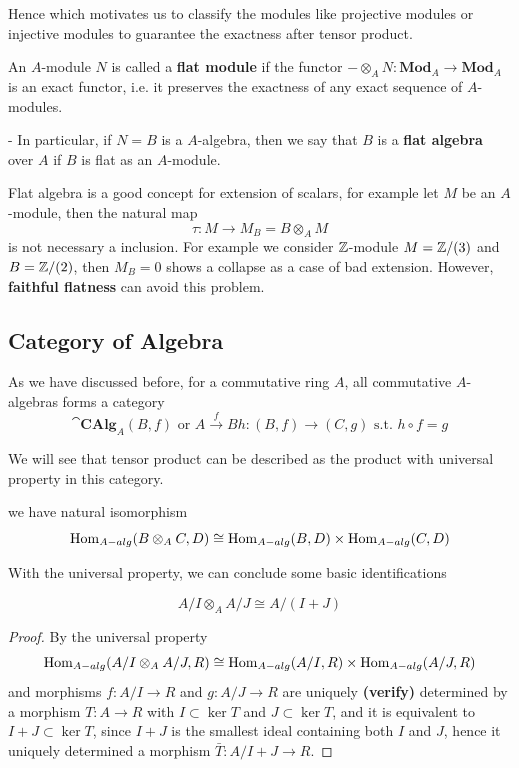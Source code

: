 Hence which motivates us to classify the modules like projective modules or injective modules to guarantee the exactness after tensor product.

\begin{definition}
    An \(A\)-module \(N\) is called a \textbf{flat module} if the functor \(- \otimes_A N: \mathbf{Mod}_A \to \mathbf{Mod}_A\) is an exact functor, i.e. it preserves the exactness of any exact sequence of \(A\)-modules.

    - In particular, if \(N = B\) is a \(A\)-algebra, then we say that \(B\) is a \textbf{flat algebra} over \(A\) if \(B\) is flat as an \(A\)-module.
\end{definition}

Flat algebra is a good concept for extension of scalars, for example let \(M\) be an \(A\)-module, then the natural map
\[\tau: M \to M_B = B \otimes_A M\]
is not necessary a inclusion. For example we consider \(\mathbb{Z}\)-module \(M = \mathbb{Z}/(3)\) and \(B = \mathbb{Z}/(2)\), then \(M_B = 0\) shows a collapse as a case of bad extension. However, \textbf{faithful flatness} can avoid this problem.

\subsection*{Category of Algebra}

As we have discussed before, for a commutative ring \(A\), all commutative \(A\)-algebras forms a category
\[\cat{\mathbf{CAlg}_A}{(B,f) \text{ or } A \xrightarrow{f} B}{h:(B,f) \to (C,g) \text{ s.t. } h \circ f = g} \]

We will see that tensor product can be described as the product with universal property in this category.
\begin{proposition}
    we have natural isomorphism
    \[\operatorname{Hom}_{A-alg}(B \otimes_A C, D) \cong \operatorname{Hom}_{A-alg}(B,D) \times \operatorname{Hom}_{A-alg}(C,D)\]
\end{proposition}

With the universal property, we can conclude some basic identifications

\begin{claim}
    \[A/I \otimes_A A/J \cong A/(I+J) \]
\end{claim}
\begin{proof}
    By the universal property
    \[\operatorname{Hom}_{A-alg}(A/I\otimes_A A/J,R) \cong \operatorname{Hom}_{A-alg}(A/I,R) \times \operatorname{Hom}_{A-alg}(A/J,R)\]
    and morphisms \(f:A/I \to R\) and \(g:A/J \to R\) are uniquely \textbf{(verify)} determined by a morphism \(T:A \to R\) with \(I \subset \ker T\) and \(J \subset \ker T\), and it is equivalent to \(I+J \subset \ker T\), since \(I+J\) is the smallest ideal containing both \(I\) and \(J\), hence it uniquely determined a morphism \(\bar{T}: A/I+J \to R\).
\end{proof}

